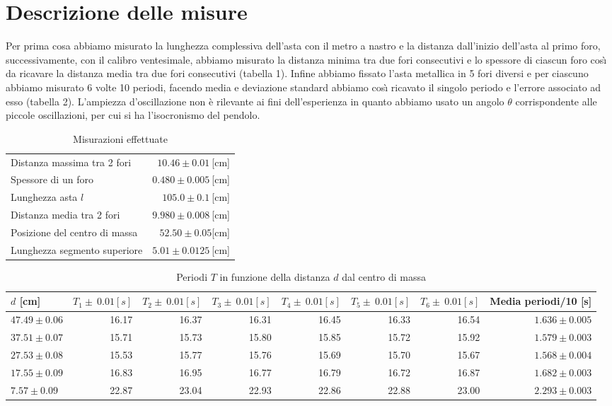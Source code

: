 \documentclass{article}
\begin{document}
		\section{Descrizione delle misure}
			Per prima cosa abbiamo misurato la lunghezza complessiva dell'asta con il metro a nastro e la distanza dall'inizio dell'asta al primo foro, successivamente, con il calibro ventesimale, abbiamo misurato la distanza minima tra due fori consecutivi e lo spessore di ciascun foro cos\`{\i} da ricavare la distanza media tra due fori consecutivi (tabella 1).
			 Infine abbiamo fissato l'asta metallica in 5 fori diversi e per ciascuno abbiamo misurato 6 volte 10 periodi, facendo media e deviazione standard abbiamo cos\`{\i} ricavato il singolo periodo e l'errore associato ad esso (tabella 2). L'ampiezza d'oscillazione non \`{e} rilevante ai fini dell'esperienza in quanto abbiamo usato un angolo $\theta$ corrispondente alle piccole oscillazioni, per cui si ha l'isocronismo del pendolo.
		\begin{table}
			\begin{adjustbox}{width=\textwidth}
				\begin{tabular}{lr}
					\centering
					Distanza massima tra 2 fori&$10.46\pm0.01\:$[cm]\\
					Spessore di un foro&$0.480\pm0.005\:$[cm]\\
					Lunghezza asta $l$&$105.0\pm0.1\:$[cm]\\
					Distanza media tra 2 fori&$9.980\pm0.008\:$[cm]\\
					Posizione del centro di massa&$52.50\pm0.05$[cm]\\
					Lunghezza segmento superiore&$5.01\pm0.0125\:$[cm]\\
				\end{tabular}
			\end{adjustbox}
			\label{tabella misure}
			\caption{Misurazioni effettuate}
		\end{table}
		\begin{table}
			\begin{adjustbox}{width=\textwidth}
				\begin{tabular}{lrrrrrrr}
					\centering
					$d$ [cm]&$T_1 \pm \:0.01[s]$&$T_2 \pm \:0.01[s]$&$T_3 \pm \: 0.01[s]$&$T_4 \pm \:0.01[s]$&$T_5 \pm \:0.01[s]$&$T_6 \pm \:0.01[s]$&Media periodi/10 [s]\\
					\hline
					\hline
					$47.49\pm0.06$&16.17&16.37&16.31&16.45&16.33&16.54&$1.636\pm0.005$\\
					$37.51\pm0.07$&15.71&15.73&15.80&15.85&15.72&15.92&$1.579\pm0.003$\\
					$27.53\pm0.08$&15.53&15.77&15.76&15.69&15.70&15.67&$1.568\pm0.004$\\
					$17.55\pm0.09$&16.83&16.95&16.77&16.79&16.72&16.87&$1.682\pm0.003$\\
					$7.57\pm0.09$&22.87&23.04&22.93&22.86&22.88&23.00&$2.293\pm0.003$\\
				\end{tabular}
			\end{adjustbox}
			\label{tabella periodi distanza}
			\caption{Periodi $T$ in funzione della distanza $d$ dal centro di massa}
		\end{table}
		
\end{document}

